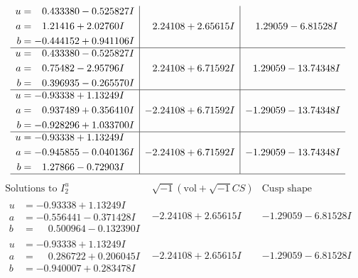 \documentclass[1p]{elsarticle_modified}
\theoremstyle{definition}
\newcommand{\I}{\sqrt{-1}}
\begin{document}
$$\begin{array}{c|c|c}
\begin{aligned}
u &= \phantom{-}0.433380 - 0.525827 I \\
a &= \phantom{-}1.21416 + 2.02760 I \\
b &= -0.444152 + 0.941106 I\end{aligned}
 & \phantom{-}2.24108 + 2.65615 I & \phantom{-}1.29059 - 6.81528 I \\ \hline\begin{aligned}
u &= \phantom{-}0.433380 - 0.525827 I \\
a &= \phantom{-}0.75482 - 2.95796 I \\
b &= \phantom{-}0.396935 - 0.265570 I\end{aligned}
 & \phantom{-}2.24108 + 6.71592 I & \phantom{-}1.29059 - 13.74348 I \\ \hline\begin{aligned}
u &= -0.93338 + 1.13249 I \\
a &= \phantom{-}0.937489 + 0.356410 I \\
b &= -0.928296 + 1.033700 I\end{aligned}
 & -2.24108 + 6.71592 I & -1.29059 - 13.74348 I \\ \hline\begin{aligned}
u &= -0.93338 + 1.13249 I \\
a &= -0.945855 - 0.040136 I \\
b &= \phantom{-}1.27866 - 0.72903 I\end{aligned}
 & -2.24108 + 6.71592 I & -1.29059 - 13.74348 I\\
 \hline 
 \end{array}$$\newpage$$\begin{array}{c|c|c}  
\text{Solutions to }I^u_{2}& \I (\text{vol} + \sqrt{-1}CS) & \text{Cusp shape}\\
 \hline 
\begin{aligned}
u &= -0.93338 + 1.13249 I \\
a &= -0.556441 - 0.371428 I \\
b &= \phantom{-}0.500964 - 0.132390 I\end{aligned}
 & -2.24108 + 2.65615 I & -1.29059 - 6.81528 I \\ \hline\begin{aligned}
u &= -0.93338 + 1.13249 I \\
a &= \phantom{-}0.286722 + 0.206045 I \\
b &= -0.940007 + 0.283478 I\end{aligned}
 & -2.24108 + 2.65615 I & -1.29059 - 6.81528 I \\ \hline\begin{aligned}

\end{aligned}
\end{array}$$
\end{document}
